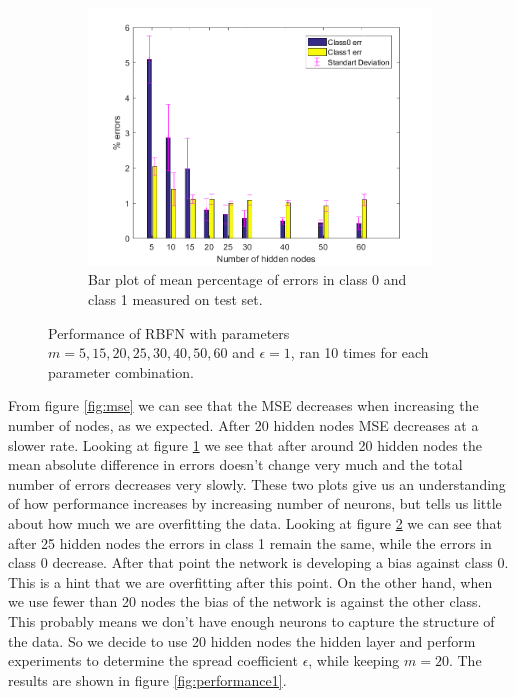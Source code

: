 \documentclass[a4paper, 11pt]{article}
\begin{document}
\begin{figure}[h!]
\begin{subfigure}[t]{0.32\textwidth}
        \label{fig:errorplot}
    \end{subfigure}
    \hfill %
    \begin{subfigure}[t]{0.32\textwidth}
        \includegraphics[width=\textwidth]{../figures/perf/errorbar_m(5-60)_e(10-10).png}
        \caption{Bar plot of mean percentage of errors in class 0 and class 1 measured on test set.}
        \label{fig:errorbar}
    \end{subfigure}
    \caption{Performance of RBFN with parameters $m = 5,15,20,25,30,40,50,60$ and $\epsilon = 1$, ran 10  times for each parameter combination.}\label{fig:performance}
\end{figure}


From figure \ref{fig:mse} we can see that the MSE decreases when increasing the number of nodes, as we expected. After 20 hidden nodes MSE decreases at a slower rate. Looking at figure \ref{fig:errorplot} we see that after around 20 hidden nodes the mean absolute difference in errors doesn't change very much and the total number of errors decreases very slowly. These two plots give us an understanding of how performance increases by increasing number of neurons, but tells us little about how much we are overfitting the data. Looking at figure \ref{fig:errorbar} we can see that after 25 hidden nodes the errors in class 1 remain the same, while the errors in class 0 decrease. After that point the network is developing a bias against class 0. This is a hint that we are overfitting after this point. On the other hand, when we use fewer than 20 nodes the bias of the network is against the other class. This probably means we don't have enough neurons to capture the structure of the data. So we decide to use 20 hidden nodes the hidden layer and perform experiments to determine the spread coefficient $\epsilon$, while keeping $m = 20$. The results are shown in figure \ref{fig:performance1}.
\end{document}
